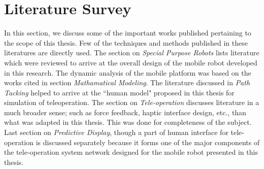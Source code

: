 \section{Literature Survey}
\label{sec_LitRev}
In this section, we  discuss some of the important works published pertaining to the scope of this thesis. Few of the techniques and methods published in these literatures are directly used. The section on \textit{Special Purpose Robots} lists literature which were reviewed to arrive at the overall design of the mobile robot developed in this research.
The dynamic analysis of the mobile platform was based on the works cited in section\textit{ Mathamatical Modeling}. 
The literature discussed in \textit{Path Tacking } helped to arrive at the ``human model" proposed in this thesis for simulation of teleoperation. 
The section on \textit{Tele-operation} discusses literature in a much broader sense; such as force feedback, haptic interface  design, etc., than what was adapted in this thesis. This was done for completeness of the subject. 
Last section on \textit{Predictive Display}, though a part of human interface for tele-operation is discussed separately because it forms one of the major components of the tele-operation system network designed  for the mobile robot  presented in this thesis.   
